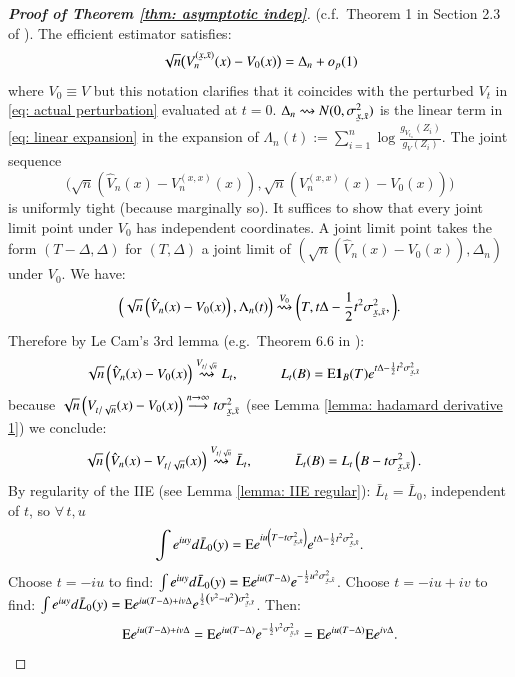 \begin{proof}[\hypertarget{Proof of asymp indep}{\textbf{Proof of Theorem \ref{thm: asymptotic indep}}}](c.f.\ Theorem 1 in Section 2.3 of \cite{33}). 
    The efficient estimator satisfies:
    $$
    \sqrt{n}\big(V_n^{(\ubar{x}, \bar{x})}(x)-V_0(x)\big)=\Delta_n+o_{p}(1)
    $$
    where $V_0 \equiv V$ but this notation clarifies that it coincides with the perturbed $V_t$ in \eqref{eq: actual perturbation} evaluated at $t=0$. $\Delta_n \rightsquigarrow N(0, \sigma_{\ubar{x},\bar{ x}}^2)$ is the linear term in \eqref{eq: linear expansion} in the expansion of 
    $\Lambda_n (t) := \sum_{i=1}^n \log{\frac{g_{\scriptscriptstyle{V_{t_n}}}(Z_i)}{g_{\scriptscriptstyle{V}}(Z_i)}}$. The joint sequence
$$
\big(\sqrt{n} (\hat{V}_n(x)-V_n^{(x, x)}(x)), \sqrt{n}(V_n^{(x, x)}(x)-V_0(x))\big)
$$
is uniformly tight (because marginally so).
It suffices to show that every joint limit point under $V_0$ has independent coordinates. A joint limit point takes the form $(T-\Delta, \Delta)$ for $(T, \Delta)$ a joint limit of $\left(\sqrt{n}\left(\hat{V}_n(x)-V_0(x)\right), \Delta_n\right)$ under $V_0$. We have:
$$
\left(\sqrt{n}\left(\hat{V}_n(x)-V_0(x)\right), \Lambda_n(t)\right) \stackrel{V_0}{\rightsquigarrow}\bigg(T, t \Delta-\frac{1}{2} t^2 \sigma_{\ubar{x},\bar{x}}^2, \bigg).
$$
Therefore by Le Cam's 3rd lemma (e.g.\ Theorem 6.6 in \cite{6}):
$$
\begin{aligned}
& \sqrt{n}\left(\hat{V}_n(x)-V_0(x)\right) \stackrel{V_{t/\sqrt{n}}}{\rightsquigarrow} L_t, \quad \quad \quad L_t(B)=\ex \ind_B(T) e^{t \Delta-\frac{1}{2} t^2 \sigma_{\ubar{x},\bar{x}}^2}
\end{aligned}
$$
because $\sqrt{n}\left(V_{t / \sqrt{n}}(x)-V_0(x)\right) \stackrel{n \rightarrow \infty}{\longrightarrow} t \sigma_{\ubar{x}, \bar{x}}^2$ (see Lemma \ref{lemma: hadamard derivative 1}) we conclude:
$$
\begin{aligned}
& \sqrt{n}\left(\hat{V}_n(x)-V_{t / \sqrt{n}}(x)\right)   \stackrel{V_{t/\sqrt{n}}}{\rightsquigarrow} \bar{L}_t, \quad \quad \quad \bar{L}_t(B)=L_t\left(B-t \sigma_{\ubar{x},\bar{x}}^2\right).
\end{aligned}
$$
By regularity of the IIE (see Lemma \ref{lemma: IIE regular}): $\bar{L}_t=\bar{L}_0$, independent of $t$, so $\forall \, t, u$
$$
\int e^{i u y} d \bar{L}_0(y)=\ex e^{i u\left(T-t \sigma_{\ubar{x},\bar{x}}^2\right)} e^{t \Delta-\frac{1}{2} t^2 \sigma_{\ubar{x},\bar{x}}^2}.
$$
Choose $t=-i u$ to find: $\int e^{i u y} d \bar{L}_0(y)=\ex e^{i u(T-\Delta)} e^{-\frac{1}{2} u^2 \sigma_{\ubar{x},\bar{x}}^2}$. Choose $t=-i u+i v$ to find: $\int e^{i u y} d \bar{L}_0(y)=\ex e^{i u(T-\Delta)+i v \Delta} e^{\frac{1}{2}\left(v^2-u^2\right) \sigma_{\ubar{x}, \bar{x}}^2}$. Then:
$$
\begin{aligned}
\ex e^{i u(T-\Delta)+i v \Delta}=\ex e^{i u(T-\Delta)} e^{-\frac{1}{2} v^2 \sigma_{\ubar{x}, \bar{x}}^2} = \ex e^{i u(T-\Delta)} \ex e^{i v \Delta}. 
\end{aligned}
$$    
\end{proof}



